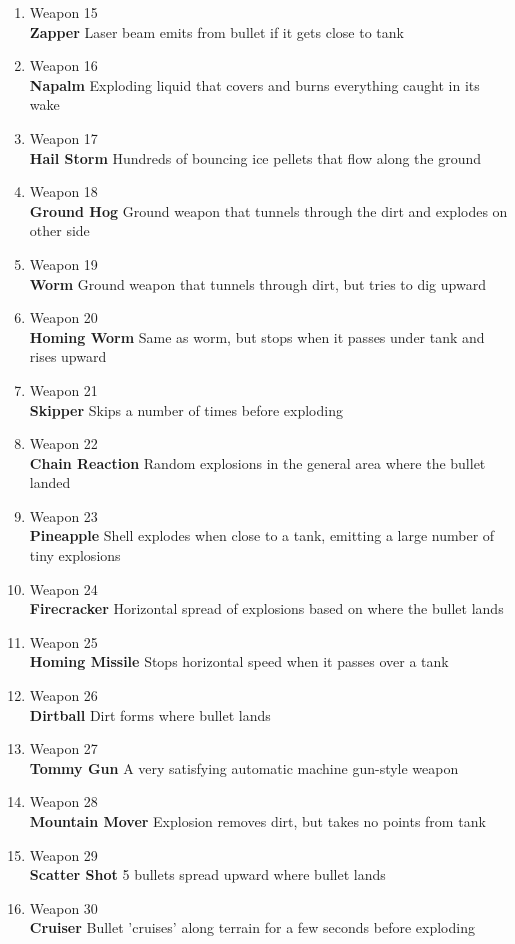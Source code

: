 \documentclass[12pt]{extarticle}
\begin{document}
\begin{enumerate}
\item Weapon 15 \\
\textbf{Zapper} 	
Laser beam emits from bullet if it gets close to tank
\item Weapon 16 \\
\textbf{Napalm} 	
Exploding liquid that covers and burns everything caught in its wake
\item Weapon 17 \\
\textbf{Hail Storm} 	
Hundreds of bouncing ice pellets that flow along the ground
\item Weapon 18 \\
\textbf{Ground Hog} 	
Ground weapon that tunnels through the dirt and explodes on other side
\item Weapon 19 \\
\textbf{Worm} 	
Ground weapon that tunnels through dirt, but tries to dig upward
\item Weapon 20 \\
\textbf{Homing Worm} 	
Same as worm, but stops when it passes under tank and rises upward
\item Weapon 21 \\
\textbf{Skipper} 	
Skips a number of times before exploding
\item Weapon 22 \\
\textbf{Chain Reaction} 	
Random explosions in the general area where the bullet landed
\item Weapon 23 \\
\textbf{Pineapple} 	
Shell explodes when close to a tank, emitting a large number of tiny explosions
\item Weapon 24 \\
\textbf{Firecracker} 	
Horizontal spread of explosions based on where the bullet lands
\item Weapon 25 \\
\textbf{Homing Missile} 	
Stops horizontal speed when it passes over a tank
\item Weapon 26 \\
\textbf{Dirtball} 	
Dirt forms where bullet lands
\item Weapon 27 \\
\textbf{Tommy Gun} 	
A very satisfying automatic machine gun-style weapon
\item Weapon 28 \\
\textbf{Mountain Mover} 	
Explosion removes dirt, but takes no points from tank
\item Weapon 29 \\
\textbf{Scatter Shot} 	
5 bullets spread upward where bullet lands
\item Weapon 30 \\
\textbf{Cruiser} 	
Bullet 'cruises' along terrain for a few seconds before exploding

\end{enumerate}
\end{document}
